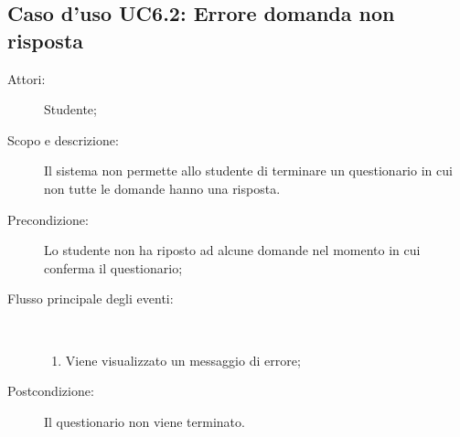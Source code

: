 \subsection{Caso d'uso UC6.2: Errore domanda non risposta}\begin{description}
\item[Attori:] Studente;
\item[Scopo e descrizione:] Il sistema non permette allo studente di terminare un questionario in cui non tutte le domande hanno una risposta.
      \item[Precondizione:] Lo studente non ha riposto ad alcune domande nel momento in cui conferma il questionario;

        \item[Flusso principale degli eventi:] \ 
 \begin{enumerate}
          \item Viene visualizzato un messaggio di errore;

      \end{enumerate}
    \item[Postcondizione:] Il questionario non viene terminato.
  \end{description}
\hypertarget{UC6.3}{}
